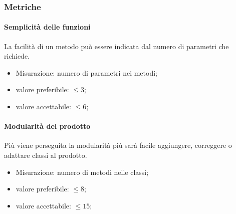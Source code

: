         \subsubsection{Metriche}
            \paragraph{Semplicità delle funzioni}
                La facilità di un metodo può essere indicata dal numero di parametri che richiede.
                \begin{itemize}
                    \item Misurazione: numero di parametri nei metodi;
                    \item valore preferibile: $\leq 3$;
                    \item valore accettabile: $\leq 6$;
                \end{itemize}
            \paragraph{Modularità del prodotto}
                Più viene perseguita la modularità più sarà facile aggiungere, correggere o adattare classi al prodotto\glo.
                \begin{itemize}
                    \item Misurazione: numero di metodi nelle classi;
                    \item valore preferibile: $\leq 8$;
                    \item valore accettabile: $\leq 15$;
                \end{itemize}
